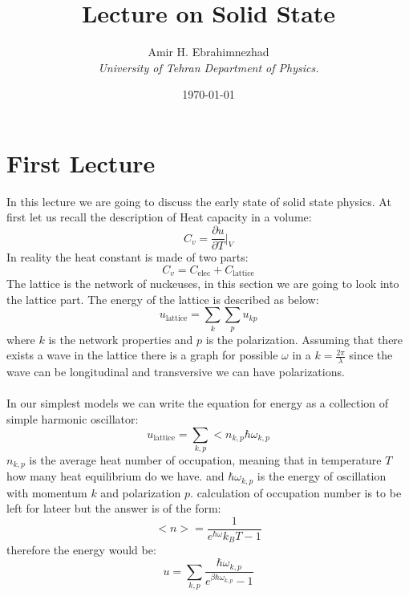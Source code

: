 \documentclass[9pt,a4paper, twocolumn]{article}
\title{Lecture on Solid State}
\date{\today}
\author{Amir H. Ebrahimnezhad \\ \small \textit{University of Tehran Department of Physics.}}
\begin{document}
     \maketitle
     \section{First Lecture}
     In this lecture we are going to discuss the early state of solid state physics. At first let us recall the description of Heat capacity in a volume:
     \begin{equation}
        C_v = \frac{\partial u}{\partial T}|_V
     \end{equation}
     In reality the heat constant is made of two parts:
     \begin{equation}
        C_v = C_{\text{elec}} + C_{\text{lattice}}
     \end{equation}
     The lattice is the network of nuckeuses, in this section we are going to look into the lattice part. The energy of the lattice is described as below:
     \begin{equation}
        u_{\text{lattice}}=\sum_k\sum_p u_{kp}
     \end{equation}
     where $k$ is the network properties and $p$ is the polarization. Assuming that there exists a wave in the lattice there is a graph for possible $\omega$ in a $k = \frac{2\pi}{\lambda}$ since the wave can be longitudinal and transversive we can have polarizations. 
     \\
     \\
     In our simplest models we can write the equation for energy as a collection of simple harmonic oscillator:
     \begin{equation}
        u_{\text{lattice}} = \sum_{k,p} <n_{k,p}\hbar \omega_{k,p}
     \end{equation}    
     $n_{k,p}$ is the average heat number of occupation, meaning that in temperature $T$ how many heat equilibrium do we have. and $\hbar \omega_{k,p}$ is the energy of oscillation with momentum $k$ and polarization $p$.  calculation of occupation number is to be left for lateer but the answer is of the form:
     \begin{equation}
        <n> = \frac{1}{e^{\hbar \omega}{k_B T} - 1}
     \end{equation}
     therefore the energy would be:
     \begin{equation}
        u = \sum_{k,p} \frac{\hbar \omega_{k,p}}{e^{\beta \hbar\omega_{k,p}} - 1}
     \end{equation}
\end{document}
